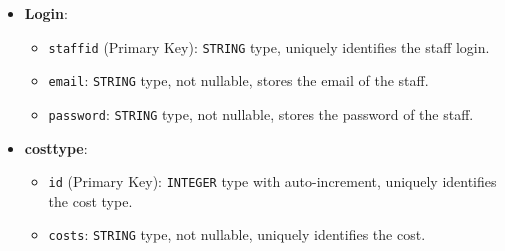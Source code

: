 \begin{itemize}
    
    \item \textbf{Login}:
    \begin{itemize}
        \item \texttt{staffid} (Primary Key): \texttt{STRING} type, uniquely identifies the staff login.
        \item \texttt{email}: \texttt{STRING} type, not nullable, stores the email of the staff.
        \item \texttt{password}: \texttt{STRING} type, not nullable, stores the password of the staff.
    \end{itemize}
    
    \item \textbf{costtype}:
    \begin{itemize}
        \item \texttt{id} (Primary Key): \texttt{INTEGER} type with auto-increment, uniquely identifies the cost type.
        \item \texttt{costs}: \texttt{STRING} type, not nullable, uniquely identifies the cost.
    \end{itemize}
    

\end{itemize}
